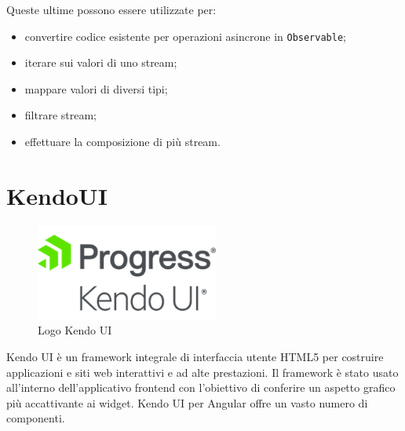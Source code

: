 Queste ultime possono essere utilizzate per:
\begin{itemize}
    \item convertire codice esistente per operazioni asincrone in \verb|Observable|;
    \item iterare sui valori di uno stream;
    \item mappare valori di diversi tipi;
    \item filtrare stream;
    \item effettuare la composizione di più stream.
\end{itemize}

\section{KendoUI}
\begin{figure}[ht!]
\begin{center}
  \includegraphics[width=6cm]{images/kendo_logo.png}
  \caption{Logo Kendo UI}
\end{center}
\end{figure}
Kendo UI è un framework integrale di interfaccia utente HTML5 per costruire applicazioni e siti web interattivi e ad alte prestazioni. \cite{KENDO}
Il framework è stato usato all'interno dell'applicativo frontend con l'obiettivo di conferire un aspetto grafico più accattivante ai widget. Kendo UI per Angular offre un vasto numero di componenti.


